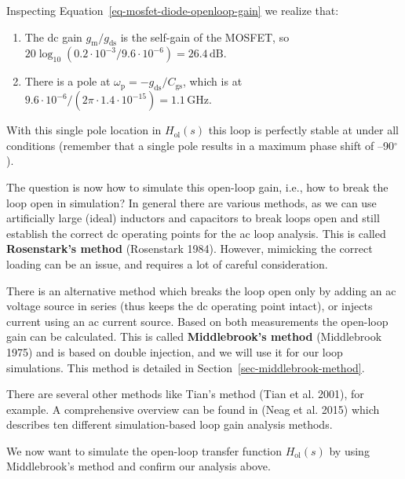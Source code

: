 \documentclass[
  a4paper,
  DIV=11,
  numbers=noendperiod]{scrartcl}
\providecommand{\tightlist}{%
  \setlength{\itemsep}{0pt}\setlength{\parskip}{0pt}}\usepackage{longtable,booktabs,array}
\begin{document}
Inspecting Equation~\ref{eq-mosfet-diode-openloop-gain} we realize that:

\begin{enumerate}
\def\labelenumi{\arabic{enumi}.}
\tightlist
\item
  The dc gain \(g_\mathrm{m}/ g_\mathrm{ds}\) is the self-gain of the
  MOSFET, so
  \(20 \log_{10}(0.2 \cdot 10^{-3} / 9.6 \cdot 10 ^{-6}) = 26.4\,\text{dB}\).
\item
  There is a pole at
  \(\omega_\mathrm{p} = -g_\mathrm{ds}/ C_\mathrm{gs}\), which is at
  \(9.6 \cdot 10 ^{-6} / (2 \pi \cdot 1.4 \cdot 10^{-15}) = 1.1\,\text{GHz}\).
\end{enumerate}

With this single pole location in \(H_\mathrm{ol}(s)\) this loop is
perfectly stable at under all conditions (remember that a single pole
results in a maximum phase shift of --90\(^\circ\)).

The question is now how to simulate this open-loop gain, i.e., how to
break the loop open in simulation? In general there are various methods,
as we can use artificially large (ideal) inductors and capacitors to
break loops open and still establish the correct dc operating points for
the ac loop analysis. This is called \textbf{Rosenstark's method}
(Rosenstark 1984). However, mimicking the correct loading can be an
issue, and requires a lot of careful consideration.

There is an alternative method which breaks the loop open only by adding
an ac voltage source in series (thus keeps the dc operating point
intact), or injects current using an ac current source. Based on both
measurements the open-loop gain can be calculated. This is called
\textbf{Middlebrook's method} (Middlebrook 1975) and is based on double
injection, and we will use it for our loop simulations. This method is
detailed in Section~\ref{sec-middlebrook-method}.

There are several other methods like Tian's method (Tian et al. 2001),
for example. A comprehensive overview can be found in (Neag et al. 2015)
which describes ten different simulation-based loop gain analysis
methods.

We now want to simulate the open-loop transfer function
\(H_\mathrm{ol}(s)\) by using Middlebrook's method and confirm our
analysis above.
\end{document}
